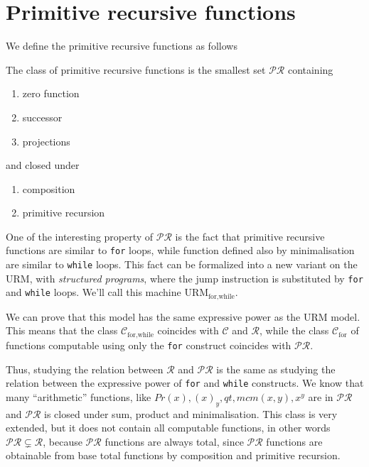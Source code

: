 \chapter{Primitive recursive functions}

We define the primitive recursive functions as follows
\begin{definition}
  The class of
primitive recursive functions is the smallest set
$\mathcal{PR}$ containing
\begin{enumerate}[label=(\alph*)]
\item zero function
\item successor
\item projections
\end{enumerate}
and closed under
\begin{enumerate}[label=(\arabic*)]
\item composition
\item primitive recursion
\end{enumerate}
\end{definition}

One of the interesting property of $\mathcal{PR}$ is the
fact that primitive recursive functions are similar to \texttt{for} loops, while
function defined also by minimalisation are similar to \texttt{while} loops. This fact can be
formalized into a new variant on the URM, with \emph{structured
  programs}, where the jump instruction is substituted by
\texttt{for} and \texttt{while} loops. We'll call this machine
$\text{URM}_{\text{for,while}}$.

We can prove that this model has the same expressive power as the
URM model. This means that the class $\mathcal{C}_{\text{for,while}}$
coincides with $\mathcal{C}$ and $\mathcal{R}$,
while the class $\mathcal{C}_{\text{for}}$ of functions computable using only the \texttt{for}
construct coincides with $\mathcal{PR}$.

Thus, studying the relation between $\mathcal{R}$ and $\mathcal{PR}$ is
the same as studying the relation between the expressive power of
\texttt{for} and \texttt{while} constructs.  We know that many
``arithmetic'' functions, like $Pr(x), (x)_y, qt, mcm(x,y),
x^y$ are in $\mathcal{PR}$ and $\mathcal{PR}$ is closed under sum,
product and minimalisation. This class is very
extended, but it does not contain all computable functions, in other
words $\mathcal{PR} \subsetneq \mathcal{R}$, because $\mathcal{PR}$
functions are always total, since
$\mathcal{PR}$ functions are obtainable from base total functions by
composition and primitive recursion.

